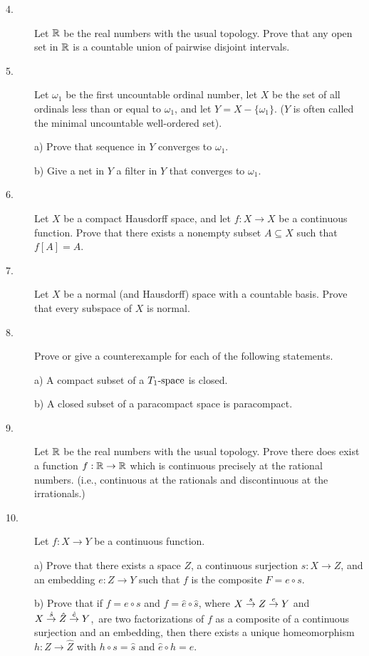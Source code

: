 \documentclass[bbb]{report}
\def\R{{\Bbb R}}
\begin{document}
\begin{large}
\begin{description}

\item[4.]
Let $\R$ be the real numbers with the usual topology.
Prove that any open set in $\R$ is a countable union of pairwise disjoint
intervals.

\item[5.]
Let $\omega_1$ be the first uncountable ordinal number, let $X$ be the
set of all ordinals less than or equal to $\omega_1$,
and let $Y=X-\{\omega_1\}$. ($Y$ is often called the minimal uncountable
well-ordered set).
\item[\quad] a) Prove that  sequence in $Y$ converges
to $\omega_1$.
\item[\quad] b) Give  a net in $Y$ 
a filter in $Y$ that converges to $\omega_1$.

\item[6.]
Let $X$ be a compact Hausdorff space, and let $f:X\to X$ be a
continuous function. Prove that there exists a nonempty subset
$A\subseteq X$ such that $f[A]=A$.


\item[7.]
Let $X$ be a normal (and Hausdorff) space with a countable basis.
Prove that every subspace of $X$ is normal.

\item[8.]
Prove or give a counterexample for each of the following statements.
\item[\quad] a) A compact subset of a $T_1\hbox{-space}$ is closed.
\item[\quad] b) A closed subset of a paracompact space is paracompact.

\item[9.]
Let $\R$ be the real numbers with the usual topology.
Prove there does  exist a function $f:\R\to\R$ which
is continuous precisely at the rational numbers.
(i.e., continuous at the rationals and discontinuous at the irrationals.)

\vfill\pagebreak

\item[10.]
Let $f:X\to Y$ be a continuous function.
\item[\quad] a)
Prove that there exists a  space $Z$, a continuous surjection
$s:X\to Z$, and an embedding $e:Z\to Y$ such that $f$ is the
composite $F=e\circ s$.
\item[\quad] b)
Prove that if $f=e\circ s$ and $f=\hat e\circ\hat s$, where
$X\buildrel s\over\to Z\buildrel e\over\to Y$
and
$X\buildrel{\hat s}\over \to \hat Z \buildrel{\hat e}\over \to Y$,\
are two factorizations of $f$ as a composite of a continuous
surjection and an embedding, then there exists a unique
homeomorphism $h:Z\to\hat Z$ with $h\circ s=\hat s$ and
$\hat e\circ h=e$.


\end{description}
\end{large}
\end{document}
